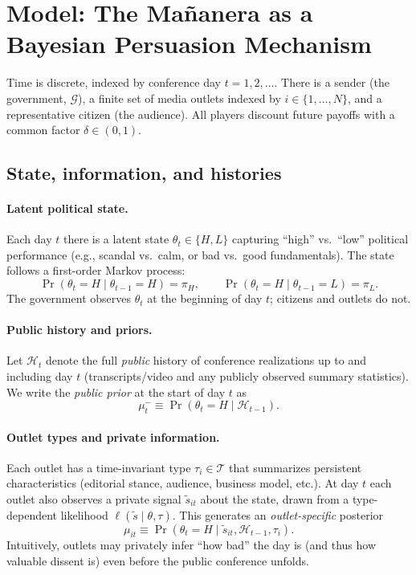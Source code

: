 \documentclass[12pt]{article}
\begin{document}
\section{Model: The Mañanera as a Bayesian Persuasion Mechanism}

Time is discrete, indexed by conference day $t=1,2,\dots$. There is a sender (the government, $\mathcal{G}$), a finite set of media outlets indexed by $i\in\{1,\dots,N\}$, and a representative citizen (the audience). All players discount future payoffs with a common factor $\delta\in(0,1)$.

\subsection{State, information, and histories}

\paragraph{Latent political state.}
Each day $t$ there is a latent state $\theta_t\in\{H,L\}$ capturing ``high'' vs.\ ``low'' political performance (e.g., scandal vs.\ calm, or bad vs.\ good fundamentals). The state follows a first-order Markov process:
\[
\Pr(\theta_t=H\mid \theta_{t-1}=H)=\pi_H,
\qquad
\Pr(\theta_t=H\mid \theta_{t-1}=L)=\pi_L.
\]
The government observes $\theta_t$ at the beginning of day $t$; citizens and outlets do not.

\paragraph{Public history and priors.}
Let $\mathcal{H}_{t}$ denote the full \emph{public} history of conference realizations up to and including day $t$ (transcripts/video and any publicly observed summary statistics). We write the \emph{public prior} at the start of day $t$ as
\[
\mu_t^{-}\equiv \Pr(\theta_t=H\mid \mathcal{H}_{t-1}).
\]

\paragraph{Outlet types and private information.}
Each outlet has a time-invariant type $\tau_i\in\mathcal{T}$ that summarizes persistent characteristics (editorial stance, audience, business model, etc.). At day $t$ each outlet also observes a private signal $\tilde{s}_{it}$ about the state, drawn from a type-dependent likelihood $\ell(\tilde{s}\mid \theta,\tau)$. This generates an \emph{outlet-specific} posterior
\[
\mu_{it}\equiv \Pr(\theta_t=H \mid \tilde{s}_{it},\mathcal{H}_{t-1},\tau_i).
\]
Intuitively, outlets may privately infer ``how bad'' the day is (and thus how valuable dissent is) even before the public conference unfolds.
\end{document}
